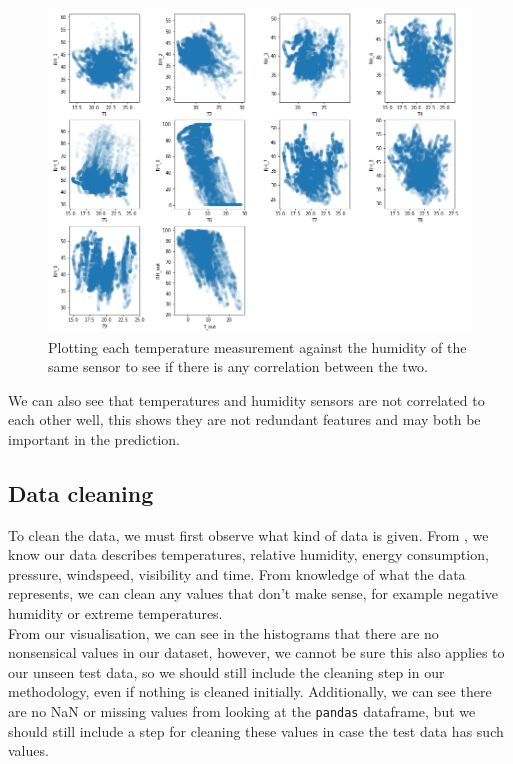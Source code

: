 \documentclass{article}
\newcommand{\n}[0]{\\[\baselineskip]}
\begin{document}
\begin{figure}[H]
\centering
\includegraphics[width=1\textwidth, keepaspectratio]{imgs/t-rh-correlation.png}
\caption{Plotting each temperature measurement against the humidity of the same sensor to see if there is any correlation between the two.}
\end{figure}
\noindent
We can also see that temperatures and humidity sensors are not correlated to each other well, this shows they are not redundant features and may both be important in the prediction. 


\subsection{Data cleaning}
To clean the data, we must first observe what kind of data is given. From \cite{paper}, we know our data describes temperatures, relative humidity, energy consumption, pressure, windspeed, visibility and time. From knowledge of what the data represents, we can clean any values that don't make sense, for example negative humidity or extreme temperatures.
\n
From our visualisation, we can see in the histograms that there are no nonsensical values in our dataset, however, we cannot be sure this also applies to our unseen test data, so we should still include the cleaning step in our methodology, even if nothing is cleaned initially. Additionally, we can see there are no NaN or missing values from looking at the \texttt{pandas} dataframe, but we should still include a step for cleaning these values in case the test data has such values. 
\end{document}
